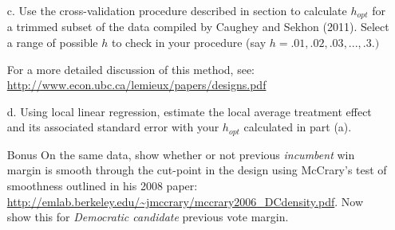 \documentclass{article}
\begin{document}
\begin{enumerate}
\item[c. ] Use the cross-validation procedure described in section to
  calculate $h_{opt}$ for a trimmed subset of the data compiled by Caughey and Sekhon
  (2011).  Select a range of possible $h$ to check in your procedure
  (say $h = .01, .02, .03, ..., .3.)$ 
\vspace{1em}

For a more detailed discussion of this method, see: \url{http://www.econ.ubc.ca/lemieux/papers/designs.pdf}

\item[d.] Using local linear regression, estimate the local average treatment effect and its associated standard error with your $h_{opt}$ calculated in part (a).

\item[Bonus] On the same data, show whether or not previous {\em incumbent} win margin is
  smooth through the cut-point in the design using McCrary's test of
  smoothness outlined in his 2008 paper:
  \url{http://emlab.berkeley.edu/~jmccrary/mccrary2006_DCdensity.pdf}.
  Now show this for {\em Democratic candidate} previous vote margin.
\end{enumerate}
\end{document}

